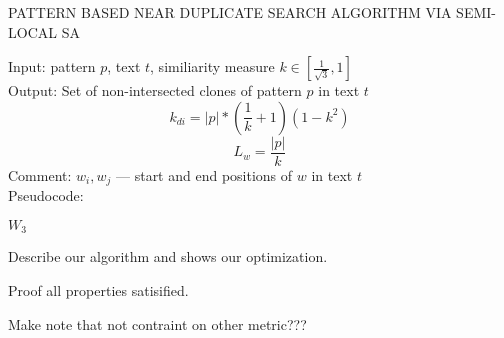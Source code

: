 \begin{algorithm}[H]
\caption{PATTERN BASED NEAR DUPLICATE
SEARCH ALGORITHM VIA SEMI-LOCAL SA}
\label{alg:patternMathing1}
Input: pattern $p$, text $t$, similiarity measure $k \in  [ \frac{1}{\sqrt{3}} ,1  ]$\\
Output: Set of non-intersected clones of pattern $p$ in text $t$
\begin{equation}
    k_{di}=|p|*(\frac{1}{k}+1)(1-k^2)
\end{equation}
\begin{equation}
 L_{w} = \frac{|p|} {k}
\end{equation}
Comment: $w_{i},w_{j}$ --- start and end positions of $w$ in text $t$ \\
Pseudocode:
\begin{algorithmic}[1]
   \ENDIF
   \ENDIF
\ENDFOR
{}
\ENDIF

\ENDFOR
\RETURN $W_3$

\end{algorithmic}
\end{algorithm}

Describe our algorithm and shows our optimization.

Proof all properties satisified.

Make note that not contraint on other metric???


